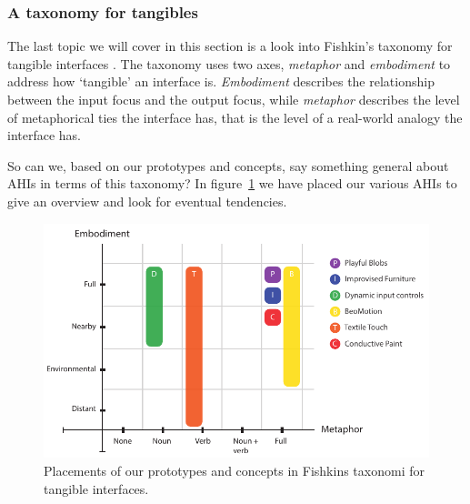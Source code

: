 
\subsubsection{A taxonomy for tangibles}
The last topic we will cover in this section is a look into Fishkin's taxonomy for tangible interfaces \citep{fishkin2004taxonomy}.
The taxonomy uses two axes, \emph{metaphor} and \emph{embodiment} to address how `tangible' an interface is.
\emph{Embodiment} describes the relationship between the input focus and the output focus, while \emph{metaphor} describes the level of metaphorical ties the interface has, that is the level of a real-world analogy the interface has.

So can we, based on our prototypes and concepts, say something general about AHIs in terms of this taxonomy?
In figure~\ref{fig:ch:adhoc2:fishkin} we have placed our various AHIs to give an overview and look for eventual tendencies. 

\begin{figure}[h]
  \centering
  \includegraphics[width=.9\textwidth]{figures/adhoc2/fishkin.pdf}
  \caption[Placements of our prototypes and concepts in Fishkins taxonomi]
  {Placements of our prototypes and concepts in Fishkins taxonomi for tangible interfaces.}
  \label{fig:ch:adhoc2:fishkin}
\end{figure}

